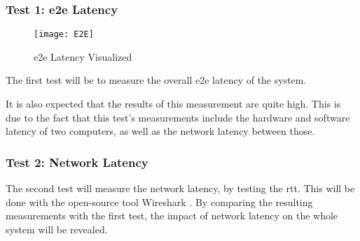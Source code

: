 \subsubsection{Test 1: \acrfull{e2e} Latency}
\begin{figure}[h!]
\caption{\acrfull{e2e} Latency Visualized \parencite{e2e}}
\label{fig:e2e}
\texttt{[image: E2E]}
\end{figure}
The first test will be to measure the overall \acrshort{e2e} latency of the system.

It is also expected that the results of this measurement are quite high. This is due to the fact that this test's measurements include the hardware and software latency of two computers, as well as the network latency between those.

\subsubsection{Test 2: Network Latency}
The second test will measure the network latency, by testing the \acrfull{rtt}. This will be done with the open-source tool Wireshark \parencite{wireshark}. By comparing the resulting measurements with the first test, the impact of network latency on the whole system will be revealed.